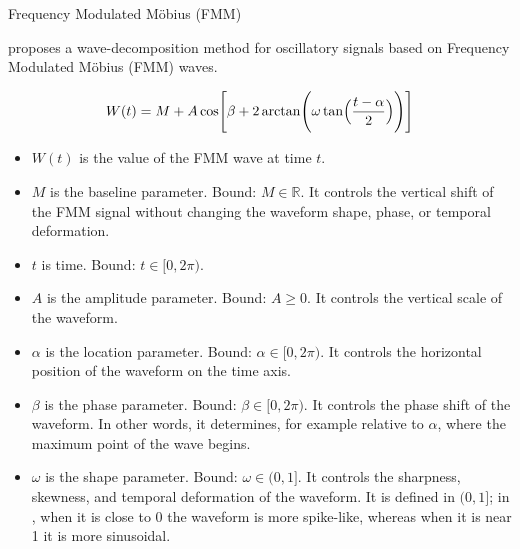 \section{}
    \begin{frame}[allowframebreaks]{Frequency Modulated M\"obius (FMM)}
        
        
        \cite{rueda-2021-a-novel-wave-decomposition-for-oscillatory-signals} proposes a wave-decomposition method for oscillatory signals based on Frequency Modulated M\"obius (FMM) waves.
        
        \begin{equation}
            W(t)
            =
            M
            +
            A
            \cos
            \Biggl[
                \beta
                +
                2
                \arctan
                \Biggl(
                \omega
                \tan
                \Bigl(
                \frac{t-\alpha}{2}
                \Bigr)
                \Biggr)
                \Biggr]
        \end{equation}
        
        \begin{itemize}
            \item $W(t)$ is the value of the FMM wave at time $t$.
            \item $M$ is the baseline parameter. Bound: $M \in \mathbb{R}$. It controls the vertical shift of the FMM signal without changing the waveform shape, phase, or temporal deformation.
            
            \item $t$ is time. Bound: $t \in [0, 2\pi)$.
            
            \item $A$ is the amplitude parameter. Bound: $A \geq 0$. It controls the vertical scale of the waveform.
            
            \item $\alpha$ is the location parameter. Bound: $\alpha \in [0, 2\pi)$. It controls the horizontal position of the waveform on the time axis.
            
            \item $\beta$ is the phase parameter. Bound: $\beta \in [0, 2\pi)$. It controls the phase shift of the waveform. In other words, it determines, for example relative to $\alpha$, where the maximum point of the wave begins.
            
            \item $\omega$ is the shape parameter. Bound: $\omega \in (0, 1]$. It controls the sharpness, skewness, and temporal deformation of the waveform. It is defined in $(0, 1]$; in \cite{rueda-2021-a-novel-wave-decomposition-for-oscillatory-signals}, when it is close to 0 the waveform is more spike-like, whereas when it is near 1 it is more sinusoidal.
        \end{itemize}
        

\end{frame}

